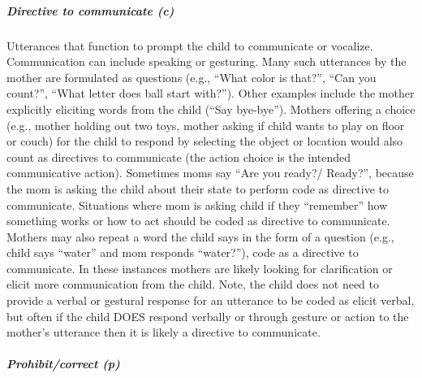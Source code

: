 \documentclass[
  12pt,
]{book}
\begin{document}
\hypertarget{directive_to_communicate}{%
\subparagraph*{Directive to communicate (c)}\label{directive_to_communicate}}

Utterances that function to prompt the child to communicate or vocalize. Communication can include speaking or gesturing. Many such utterances by the mother are formulated as questions (e.g., ``What color is that?'', ``Can you count?'', ``What letter does ball start with?''). Other examples include the mother explicitly eliciting words from the child (``Say bye-bye''). Mothers offering a choice (e.g., mother holding out two toys, mother asking if child wants to play on floor or couch) for the child to respond by selecting the object or location would also count as directives to communicate (the action choice is the intended communicative action). Sometimes moms say ``Are you ready?/ Ready?'', because the mom is asking the child about their state to perform code as directive to communicate. Situations where mom is asking child if they ``remember'' how something works or how to act should be coded as directive to communicate.
Mothers may also repeat a word the child says in the form of a question (e.g., child says ``water'' and mom responds ``water?''), code as a directive to communicate. In these instances mothers are likely looking for clarification or elicit more communication from the child.
Note, the child does not need to provide a verbal or gestural response for an utterance to be coded as elicit verbal, but often if the child DOES respond verbally or through gesture or action to the mother's utterance then it is likely a directive to communicate.

\hypertarget{prohibit_correct}{%
\subparagraph*{Prohibit/correct (p)}\label{prohibit_correct}}
\end{document}
